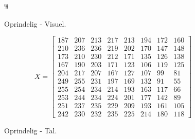 \begin{figure}[!h]
\begin{minipage}[b]{0.27\linewidth}
\centering
\includegraphics[width=\textwidth]{Billeder/LenaAnvendelse/testBillede/testBillede1.png}
\caption{Oprindelig - Visuel.}
\label{fig:X_anvendelse-tal-start}
\end{minipage}
\hspace{0.5cm}
\begin{minipage}[b]{0.45\linewidth}
\centering
\[X = \begin{bmatrix}
187 & 207 & 213 & 217 & 213 & 194 & 172 & 160 \\
210 & 236 & 236 & 219 & 202 & 170 & 147 & 148 \\
173 & 210 & 230 & 212 & 171 & 135 & 126 & 138 \\
167 & 190 & 203 & 171 & 123 & 106 & 119 & 125 \\
204 & 217 & 207 & 167 & 127 & 107 & 99 & 81 \\
249 & 255 & 231 & 197 & 169 & 132 & 91 & 55 \\
255 & 254 & 234 & 214 & 193 & 163 & 117 & 66 \\
253 & 244 & 234 & 224 & 201 & 177 & 142 & 89 \\
251 & 237 & 235 & 229 & 209 & 193 & 161 & 105 \\
242 & 230 & 232 & 235 & 225 & 214 & 180 & 118
\end{bmatrix}\]
\caption{Oprindelig - Tal.}
\label{fig:X_anvendelse-tal-start1}
\end{minipage}
\end{figure}

